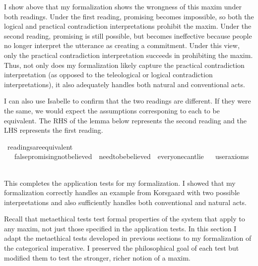 \begin{isabellebody}
\begin{isamarkuptext}
I show above that my formalization shows the wrongness of this maxim under both readings. Under the 
first reading, promising becomes impossible, so both the logical and 
practical contradiction interpretations prohibit the maxim. Under the second reading, promising is still
possible, but becomes ineffective because people no longer interpret the utterance as creating a commitment.
Under this view, only the practical contradiction interpretation succeeds in prohibiting the maxim. Thus, 
not only does my formalization likely capture the practical contradiction interpretation (as opposed to 
the teleological or logical contradiction interpretations), it also adequately handles both natural 
and conventional acts.%
\end{isamarkuptext}\isamarkuptrue%
%
\begin{isamarkuptext}%
I can also use Isabelle to confirm that the two readings are different. If they were the same, 
we would expect the assumptions corresponing to each to be equivalent. The RHS of the lemma below represents 
the second reading and the LHS represents the first reading.%
\end{isamarkuptext}\isamarkuptrue%
\isamarkupfalse%
\ readings{\isacharunderscore}are{\isacharunderscore}equivalent{\isacharcolon}\isanewline
\ \ \ {\isachardoublequoteopen}false{\isacharunderscore}promising{\isacharunderscore}not{\isacharunderscore}believed\ {\isasymand}\ need{\isacharunderscore}to{\isacharunderscore}be{\isacharunderscore}believed\ {\isasymequiv}\ everyone{\isacharunderscore}can{\isacharprime}t{\isacharunderscore}lie{\isachardoublequoteclose}\isanewline
\ \ \isamarkupfalse%
{\isacharbrackleft}user{\isacharunderscore}axioms{\isacharbrackright}%
\isadelimproof
\ %
\endisadelimproof
%
\isatagproof
{}\isamarkupfalse%
\isanewline
%
%
\endisatagproof
{\isafoldproof}%
%
\isadelimproof
%
\endisadelimproof
%
\begin{isamarkuptext}%
This completes the application tests for my formalization. I showed that my formalization correctly 
handles an example from Korsgaard with two possible interpretations and also sufficiently handles both 
conventional and natural acts.%
\end{isamarkuptext}\isamarkuptrue%
%
\isadelimdocument
%
\endisadelimdocument
%
\isatagdocument
%
\isamarkuptrue%
%
\endisatagdocument
{\isafolddocument}%
%
\isadelimdocument
%
\endisadelimdocument
%
\begin{isamarkuptext}%
Recall that metaethical tests test formal properties of the system that apply to any maxim, not 
just those specified in the application tests. In this section I adapt the metaethical tests developed 
in previous sections to my formalization of the categorical imperative. I preserved the philosophical 
goal of each test but modified them to test the stronger, richer notion of a maxim.


\end{isamarkuptext}
\end{isabellebody}

